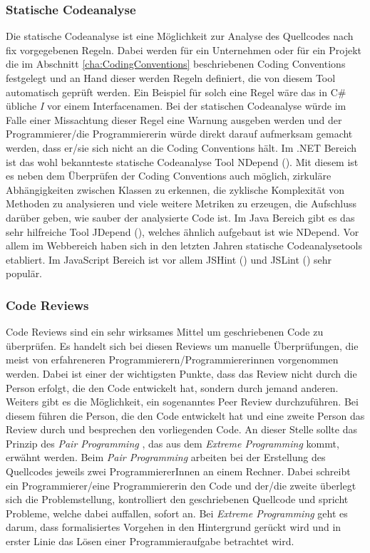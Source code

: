 \subsubsection{Statische Codeanalyse}
Die statische Codeanalyse ist eine Möglichkeit zur Analyse des Quellcodes nach fix vorgegebenen Regeln. Dabei werden für ein Unternehmen oder für ein Projekt die im Abschnitt \ref{cha:CodingConventions} beschriebenen Coding Conventions festgelegt und an Hand dieser werden Regeln definiert, die von diesem Tool automatisch geprüft werden. Ein Beispiel für solch eine Regel wäre das in C\# übliche \textit{I} vor einem Interfacenamen. Bei der statischen Codeanalyse würde im Falle einer Missachtung dieser Regel eine Warnung ausgeben werden und der Programmierer/die Programmiererin würde direkt darauf aufmerksam gemacht werden, dass er/sie sich nicht an die Coding Conventions hält. Im .NET Bereich ist das wohl bekannteste statische Codeanalyse Tool NDepend (\cite{NDepend2016}). Mit diesem ist es neben dem Überprüfen der Coding Conventions auch möglich, zirkuläre Abhängigkeiten zwischen Klassen zu erkennen, die zyklische Komplexität von Methoden zu analysieren und viele weitere Metriken zu erzeugen, die Aufschluss darüber geben, wie sauber der analysierte Code ist. Im Java Bereich gibt es das sehr hilfreiche Tool JDepend (\cite{JDepend2016}), welches ähnlich aufgebaut ist wie NDepend. Vor allem im Webbereich haben sich in den letzten Jahren statische Codeanalysetools etabliert. Im JavaScript Bereich ist vor allem JSHint (\cite{JSHint2016})  und JSLint (\cite{JSLint2016}) sehr populär. 

\subsubsection{Code Reviews}
Code Reviews sind ein sehr wirksames Mittel um geschriebenen Code zu überprüfen. Es handelt sich bei diesen Reviews um manuelle Überprüfungen, die meist von erfahreneren Programmierern/Programmiererinnen vorgenommen werden. Dabei ist einer der wichtigsten Punkte, dass das Review nicht durch die Person erfolgt, die den Code entwickelt hat, sondern durch jemand anderen. Weiters gibt es die Möglichkeit, ein sogenanntes Peer Review durchzuführen. Bei diesem führen die Person, die den Code entwickelt hat und eine zweite Person das Review durch und besprechen den vorliegenden Code. An dieser Stelle sollte das Prinzip des \textit{Pair Programming} \cite{Pair2016}, das aus dem \textit{Extreme Programming} \cite{Beck2005} kommt, erwähnt werden. Beim \textit{Pair Programming} arbeiten bei der Erstellung des Quellcodes jeweils zwei ProgrammiererInnen an einem Rechner. Dabei schreibt ein Programmierer/eine Programmiererin den Code und der/die zweite überlegt sich die Problemstellung, kontrolliert den geschriebenen Quellcode und spricht Probleme, welche dabei auffallen, sofort an. Bei \textit{Extreme Programming} geht es darum, dass formalisiertes Vorgehen in den Hintergrund gerückt wird und in erster Linie das Lösen einer Programmieraufgabe betrachtet wird. 

